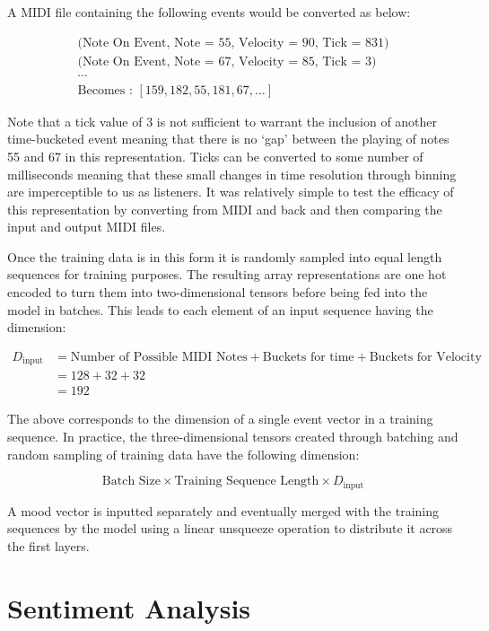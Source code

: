 \documentclass[12pt,]{article}
\begin{document}
A MIDI file containing the following events would be converted as below:

\[\begin{gathered}
\text{(Note On Event, Note = 55, Velocity = 90, Tick = 831)} \\
\text{(Note On Event, Note = 67, Velocity = 85, Tick = 3)}\\
\cdots\\
\text{Becomes : } [159, 182, 55, 181, 67, \dots]
\end{gathered}\]

Note that a tick value of 3 is not sufficient to warrant the inclusion
of another time-bucketed event meaning that there is no `gap' between
the playing of notes 55 and 67 in this representation. Ticks can be
converted to some number of milliseconds meaning that these small
changes in time resolution through binning are imperceptible to us as
listeners. It was relatively simple to test the efficacy of this
representation by converting from MIDI and back and then comparing the
input and output MIDI files.

Once the training data is in this form it is randomly sampled into equal
length sequences for training purposes. The resulting array
representations are one hot encoded to turn them into two-dimensional
tensors before being fed into the model in batches. This leads to each
element of an input sequence having the dimension:

\[\begin{aligned}
D_{\text{input}} &= \text{Number of Possible MIDI Notes} + \text{Buckets for time} + \text{Buckets for Velocity}\\
&= 128 + 32 + 32\\
&= 192
\end{aligned}\]

The above corresponds to the dimension of a single event vector in a
training sequence. In practice, the three-dimensional tensors created
through batching and random sampling of training data have the following
dimension:

\[\text{Batch Size} \times \text{Training Sequence Length} \times D_{\text{input}}\]

A mood vector is inputted separately and eventually merged with the
training sequences by the model using a linear unsqueeze operation to
distribute it across the first layers.

\hypertarget{sentiment-analysis}{%
\section{Sentiment Analysis}\label{sentiment-analysis}}
\end{document}

